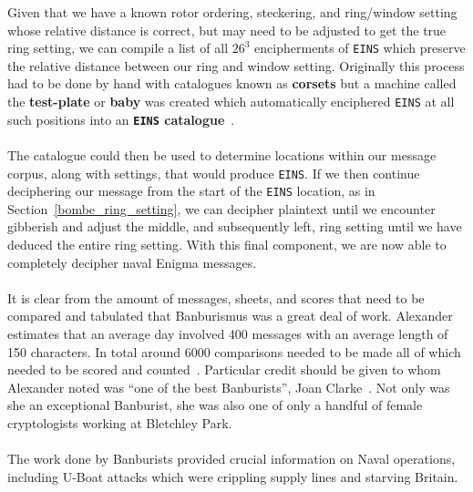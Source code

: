 \noindent Given that we have a known rotor ordering, steckering,
and ring/window setting whose relative distance is correct, but may
need to be adjusted to get the true ring setting, we can compile a
list of all $26^3$ encipherments of \texttt{EINS} which preserve
the relative distance between our ring and window setting.
Originally this process had to be done by hand with catalogues
known as {\bf{corsets}} but a machine called the {\bf{test-plate}}
or {\bf{baby}} was created which automatically enciphered
\texttt{EINS} at all such positions into an {\bf{\texttt{EINS} catalogue}}~\cite[pp.~140--142]{Turing1940ProfBook}.
\\\\The catalogue could then be used to determine locations within our
message corpus, along with settings, that would produce
\texttt{EINS}. If we then continue deciphering our message from the
start of the \texttt{EINS} location, as in
Section~\ref{bombe_ring_setting}, we can decipher plaintext until we
encounter gibberish and adjust the middle, and subsequently left, ring setting
until we have deduced the entire ring setting. With this final
component, we are now able to completely decipher naval Enigma messages.
\\\\It is clear from the amount of messages, sheets, and scores
that need to be compared and tabulated that Banburismus was a great
deal of work. Alexander estimates that an average day involved 400
messages with an average length of 150 characters. In total around
6000 comparisons needed to be made all of which needed to be scored
and counted~\cite[p.~109]{Alexander1945}. Particular credit should be given to whom Alexander
noted was ``one of the best Banburists'', Joan Clarke~\cite[p.~73]{Alexander1945}. Not only was
she an exceptional Banburist, she was also one of only a handful of
female cryptologists working at Bletchley Park.
\\\\The work done by Banburists provided crucial information on
Naval operations, including U-Boat attacks which were crippling
supply lines and starving Britain.

